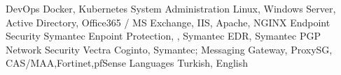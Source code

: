 

\begin{cvskills}
  \cvskill
    {DevOps} %
    {Docker, Kubernetes} %
  \cvskill
    {System Administration} %
    {Linux, Windows Server, Active Directory, Office365 / MS Exchange, IIS, Apache, NGINX} %
  \cvskill
    {Endpoint Security} %
    {Symantec Enpoint Protection, , Symantec EDR, Symantec PGP} %
  \cvskill
    {Network Security} %
    {Vectra Coginto, Symantec; Messaging Gateway, ProxySG, CAS/MAA,Fortinet,pfSense} %
  \cvskill
    {Languages} %
    {Turkish, English} %
\end{cvskills}
